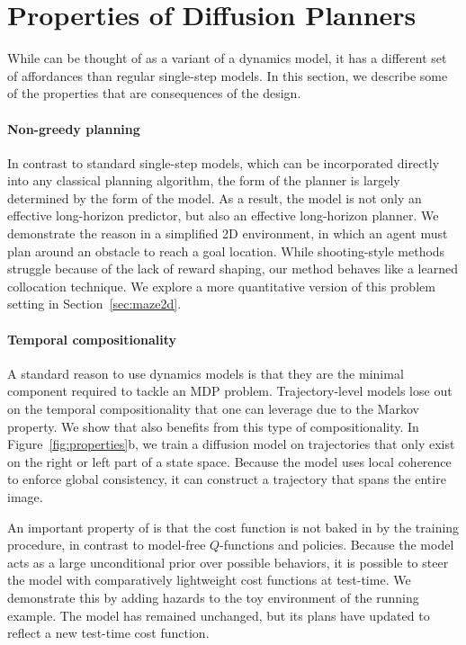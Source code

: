 
\section{Properties of Diffusion Planners}

While \method can be thought of as a variant of a dynamics model, it has a different set of affordances than regular single-step models.
In this section, we describe some of the properties that are consequences of the design.

\paragraph{Non-greedy planning}
In contrast to standard single-step models, which can be incorporated directly into any classical planning algorithm,
the form of the planner is largely determined by the form of the model.
As a result, the model is not only an effective long-horizon predictor, but also an effective long-horizon planner.
We demonstrate the reason in a simplified 2D environment, in which an agent must plan around an obstacle to reach a goal location.
While shooting-style methods struggle because of the lack of reward shaping, our method behaves like a learned collocation technique.
We explore a more quantitative version of this problem setting in Section~\ref{sec:maze2d}.

\paragraph{Temporal compositionality}
A standard reason to use dynamics models is that they are the minimal component required to tackle an MDP problem.
Trajectory-level models lose out on the temporal compositionality that one can leverage due to the Markov property.
We show that \method also benefits from this type of compositionality.
In Figure~\ref{fig:properties}b, we train a diffusion model on trajectories that only exist on the right or left part of a state space.
Because the model uses local coherence to enforce global consistency, it can construct a trajectory that spans the entire image.

An important property of \method is that the cost function is not baked in by the training procedure, in contrast to model-free $Q$-functions and policies.
Because the model acts as a large unconditional prior over possible behaviors, it is possible to steer the model with comparatively lightweight cost functions at test-time.
We demonstrate this by adding hazards to the toy environment of the running example.
The model has remained unchanged, but its plans have updated to reflect a new test-time cost function.

